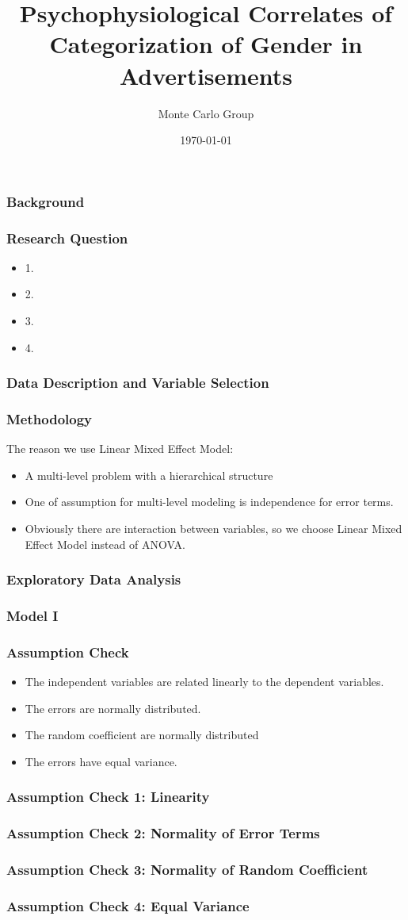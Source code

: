 \documentclass{beamer}
\title{Psychophysiological Correlates of Categorization of Gender in Advertisements}
\author{Monte Carlo Group}
\date{\today}
\begin{document}
\frame{\titlepage}


\frame
{
  \frametitle{Background}

}

\frame
{
\frametitle{Research Question}
\begin{itemize}
  \item 1.
  \item 2.
  \item 3.
  \item 4.
  
\end{itemize}
}

\frame
{
\frametitle{Data Description and Variable Selection}
}

\frame
{
  \frametitle{Methodology}
    The reason we use Linear Mixed Effect Model:
  \begin{itemize}
  \item A multi-level problem with a hierarchical structure
  \item One of assumption for multi-level modeling is independence for error terms.
  \item Obviously there are interaction between variables, so we choose Linear Mixed Effect Model instead of ANOVA.
  \end{itemize}


}

\frame
{
\frametitle{Exploratory Data Analysis}
}

\frame
{
\frametitle{Model I}
}

\frame
{
\frametitle{Assumption Check}
 \begin{itemize}
 \item The independent variables are related linearly to the dependent variables.
 \item The errors are normally distributed.
 \item The random coefficient are normally distributed
 \item The errors have equal variance.
  \end{itemize}
}

\frame
{
\frametitle{Assumption Check 1: Linearity}


}

\frame
{
\frametitle{Assumption Check 2: Normality of Error Terms}


}

\frame
{
\frametitle{Assumption Check 3: Normality of Random Coefficient}


}

\frame
{
\frametitle{Assumption Check 4: Equal Variance}


}
\end{document}

